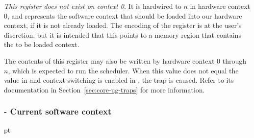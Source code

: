 \normalsize\vskip 6pt
\noindent \emph{This register does not exist on context 0.} It is hardwired to
$n$ in hardware context 0, and represents the software context that
should be loaded into our hardware context, if it is not already loaded. The
encoding of the register is at the user's discretion, but it is intended that
this points to a memory region that contains the to be loaded context.

The contents of this register may also be written by hardware context 0 through
$n$, which is expected to run the scheduler. When this value does not
equal the value in   and context switching is enabled in ,
the  trap is caused. Refer to its documentation in
Section~\ref{sec:core-ug-traps} for more information.
\subsubsection[CR\_CSC - Current software context]{ - Current software context}
\label{reg:CSC}
\label{reg:CSC}
 pt\relax\noindent\footnotesize
